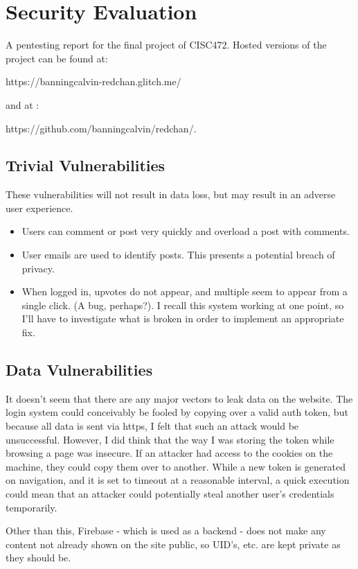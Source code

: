 %
%
\chapter{Security Evaluation}
A pentesting report for the final project of CISC472. Hosted versions of the project can be found at:

https://banningcalvin-redchan.glitch.me/

and at :

https://github.com/banningcalvin/redchan/.


\section{Trivial Vulnerabilities}
These vulnerabilities will not result in data loss, but may result in an adverse user experience.
\begin{itemize}
    \item Users can comment or post very quickly and overload a post with comments.
    \item User emails are used to identify posts. This presents a potential breach of privacy.
    \item When logged in, upvotes do not appear, and multiple seem to appear from a single click. (A bug, perhaps?). I recall this system working at one point, so I'll have to investigate what is broken in order to implement an appropriate fix.
\end{itemize}

\section{Data Vulnerabilities}
It doesn't seem that there are any major vectors to leak data on the website. The login system could conceivably be fooled by copying over a valid auth token, but because all data is sent via https, I felt that such an attack would be unsuccessful. However, I did think that the way I was storing the token while browsing a page was insecure. If an attacker had access to the cookies on the machine, they could copy them over to another. While a new token is generated on navigation, and it is set to timeout at a reasonable interval, a quick execution could mean that an attacker could potentially steal another user's credentials temporarily.

Other than this, Firebase - which is used as a backend - does not make any content not already shown on the site public, so UID's, etc. are kept private as they should be.

